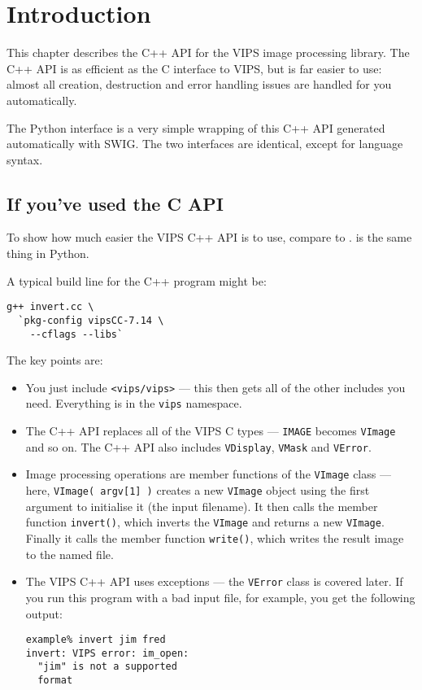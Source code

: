 \section{Introduction}

This chapter describes the C++ API for the VIPS image processing library.
The C++ API is as efficient as the C interface to VIPS, but is
far easier to use: almost all creation, destruction and error handling issues
are handled for you automatically.

The Python interface is a very simple wrapping of this C++ API generated
automatically with SWIG. The two interfaces are identical, except for language
syntax.

\subsection{If you've used the C API}

To show how much easier the VIPS C++ API is to use, compare 
to .  is the same thing in Python.

A typical build line for the C++ program might be:

\begin{verbatim}
g++ invert.cc \
  `pkg-config vipsCC-7.14 \
    --cflags --libs` 
\end{verbatim}

The key points are:

\begin{itemize}

\item
You just include \verb+<vips/vips>+ --- this then gets all of the
other includes you need. Everything is in the \verb+vips+ namespace.

\item
The C++ API replaces all of the VIPS C types --- \verb+IMAGE+ becomes
\verb+VImage+ and so on. The C++ API also includes \verb+VDisplay+,
\verb+VMask+ and \verb+VError+.

\item
Image processing operations are member functions of the \verb+VImage+ class
--- here, \verb+VImage( argv[1] )+ creates a new \verb+VImage+ object using
the first argument to initialise it (the input filename). It then calls the
member function \verb+invert()+, which inverts the \verb+VImage+ and returns a
new \verb+VImage+.  Finally it calls the member function \verb+write()+, which
writes the result image to the named file.

\item
The VIPS C++ API uses exceptions --- the \verb+VError+ class is covered
later. If you run this program with a bad input file, for example, you get the
following output:

\begin{verbatim}
example% invert jim fred
invert: VIPS error: im_open: 
  "jim" is not a supported 
  format
\end{verbatim}

\end{itemize}

